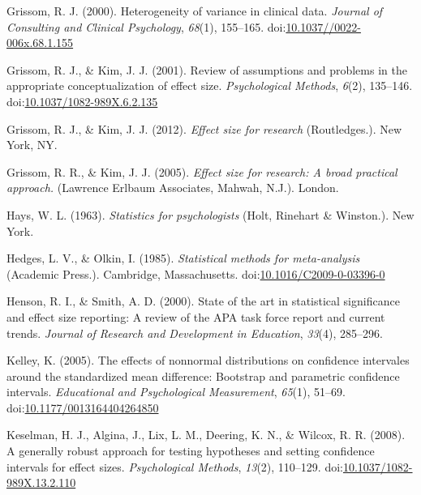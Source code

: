 \documentclass[
  man,floatsintext]{apa6}
\begin{document}
\leavevmode\hypertarget{ref-Grissom_2000}{}%
Grissom, R. J. (2000). Heterogeneity of variance in clinical data. \emph{Journal of Consulting and Clinical Psychology}, \emph{68}(1), 155--165. doi:\href{https://doi.org/10.1037//0022-006x.68.1.155}{10.1037//0022-006x.68.1.155}

\leavevmode\hypertarget{ref-Grissom_Kim_2001}{}%
Grissom, R. J., \& Kim, J. J. (2001). Review of assumptions and problems in the appropriate conceptualization of effect size. \emph{Psychological Methods}, \emph{6}(2), 135--146. doi:\href{https://doi.org/10.1037/1082-989X.6.2.135}{10.1037/1082-989X.6.2.135}

\leavevmode\hypertarget{ref-Grissom_and_Kim_2012}{}%
Grissom, R. J., \& Kim, J. J. (2012). \emph{Effect size for research} (Routledges.). New York, NY.

\leavevmode\hypertarget{ref-Grissom_and_kim_2005}{}%
Grissom, R. R., \& Kim, J. J. (2005). \emph{Effect size for research: A broad practical approach.} (Lawrence Erlbaum Associates, Mahwah, N.J.). London.

\leavevmode\hypertarget{ref-Hays_1963}{}%
Hays, W. L. (1963). \emph{Statistics for psychologists} (Holt, Rinehart \& Winston.). New York.

\leavevmode\hypertarget{ref-Hedges_Olkin_1985}{}%
Hedges, L. V., \& Olkin, I. (1985). \emph{Statistical methods for meta-analysis} (Academic Press.). Cambridge, Massachusetts. doi:\href{https://doi.org/10.1016/C2009-0-03396-0}{10.1016/C2009-0-03396-0}

\leavevmode\hypertarget{ref-Henson_Smith_2000}{}%
Henson, R. I., \& Smith, A. D. (2000). State of the art in statistical significance and effect size reporting: A review of the APA task force report and current trends. \emph{Journal of Research and Development in Education}, \emph{33}(4), 285--296.

\leavevmode\hypertarget{ref-Kelley_2005}{}%
Kelley, K. (2005). The effects of nonnormal distributions on confidence intervales around the standardized mean difference: Bootstrap and parametric confidence intervals. \emph{Educational and Psychological Measurement}, \emph{65}(1), 51--69. doi:\href{https://doi.org/10.1177/0013164404264850}{10.1177/0013164404264850}

\leavevmode\hypertarget{ref-Keselman_et_al_2008}{}%
Keselman, H. J., Algina, J., Lix, L. M., Deering, K. N., \& Wilcox, R. R. (2008). A generally robust approach for testing hypotheses and setting confidence intervals for effect sizes. \emph{Psychological Methods}, \emph{13}(2), 110--129. doi:\href{https://doi.org/10.1037/1082-989X.13.2.110}{10.1037/1082-989X.13.2.110}
\end{document}
